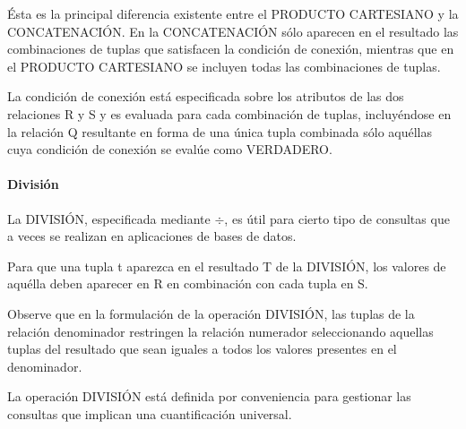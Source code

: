 Ésta es la principal diferencia existente entre el PRODUCTO CARTESIANO y la CONCATENACIÓN. En la CONCATENACIÓN sólo aparecen en el resultado las combinaciones de tuplas que satisfacen la condición de conexión, mientras que en el PRODUCTO CARTESIANO
se incluyen todas las combinaciones de tuplas.


La condición de conexión está especificada sobre los atributos de las dos relaciones R y S y es evaluada para cada combinación de tuplas, incluyéndose en la relación Q resultante en forma de una única tupla combinada sólo aquéllas cuya condición de conexión se evalúe como VERDADERO.

\paragraph{División}

La DIVISIÓN, especificada mediante $\div$, es útil para cierto tipo de consultas que a veces se realizan en aplicaciones de bases de datos. 


Para que una tupla t aparezca en el resultado T de la DIVISIÓN, los valores de aquélla deben aparecer en R en combinación con cada tupla en S.


Observe que en la formulación de la operación DIVISIÓN, las tuplas de la relación denominador restringen la relación numerador seleccionando aquellas tuplas del resultado que sean iguales a todos los valores presentes en el denominador. 

La operación DIVISIÓN está definida por conveniencia para gestionar las consultas que implican una cuantificación universal.